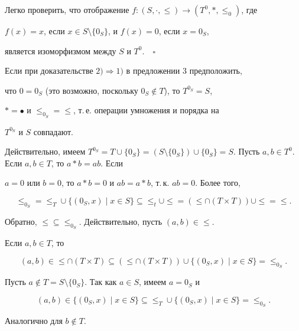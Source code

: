 Легко проверить, что отображение $f:(S,\cdot,\le)\to(T^0,*,\le_0)$, где 


$f(x)=x$, если $x\in S\setminus\{0_S\}$, и $f(x)=0$, если $x=0_S$, 


является изоморфизмом между $S$ и $T^0$.$\quad\square$ 


 


\begin{note} 


Если при доказательстве $2)\Rightarrow1)$ в предложении 3 предположить, 


что $0=0_S$ (это возможно, поскольку $0_S\notin T$), то $T^{0_S}=S$, 


$*=\bullet$ и $\le_{0_S}=\le$, т.\,е. операции умножения и порядка на 


$T^{0_S}$ и $S$ совпадают. 


\end{note} 


 


Действительно, имеем $T^{0_S}=T\cup\{0_S\}=(S \setminus\{0_S\}) 


\cup\{0_S\}=S$. Пусть $a,b\in T^0$. Если $a,b\in T$, то $a*b=ab$. Если 


$a=0$ или $b=0$, то $a*b=0$ и $ab=a*b$, т.\,к. $ab=0$. Более того, 


$$ 


\le_{0_S}=\le_T\cup\{(0_S,x)\mid x\in S\}\subseteq\le_t\cup 


\le=(\le\cap(T\times T))\cup\le=\le. 


$$ 


Обратно, $\le\subseteq\le_{0_S}$. Действительно, пусть $(a,b)\in\le$. 


Если $a,b\in T$, то 


$$ 


(a,b)\in\le\cap(T\times T)\subseteq(\le\cap(T\times T))\cup 


\{(0_S,x)\mid x\in S\}=\le_{0_S}. 


$$ 


Пусть $a\notin T=S\setminus\{0_S\}$. Так как $a\in S$, имеем $a=0_S$ и 


$$ 


(a,b)\in\{(0_S,x)\mid x\in S\}\subseteq\le_T\cup 


\{(0_S,x)\mid x\in S\}=\le_{0_S}. 


$$ 


Аналогично для $b\notin T$. 


\medskip


